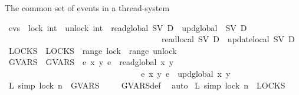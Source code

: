 \begin{isabellebody}
\isamarkuptrue%
%
\endisatagdocument
{\isafolddocument}%
%
\isadelimdocument
%
\endisadelimdocument
%
\begin{isamarkuptext}%
The common set of events in a thread-system%
\end{isamarkuptext}\isamarkuptrue%
\isamarkupfalse%
\ evs\ {\isacharequal}{\kern0pt}\ lock\ int\ {\isacharbar}{\kern0pt}\ unlock\ int\ {\isacharbar}{\kern0pt}\ read\isactrlsub g\isactrlsub l\isactrlsub o\isactrlsub b\isactrlsub a\isactrlsub l\ SV\ D\ {\isacharbar}{\kern0pt}\ upd\isactrlsub g\isactrlsub l\isactrlsub o\isactrlsub b\isactrlsub a\isactrlsub l\ \ SV\ D\ \isanewline
\ \ \ \ \ \ \ \ \ \ \ \ \ \ \ \ \ \ \ \ \ \ \ \ \ \ \ \ \ \ \ \ \ \ \ \ \ {\isacharbar}{\kern0pt}\ read\isactrlsub l\isactrlsub o\isactrlsub c\isactrlsub a\isactrlsub l\ SV\ D\ {\isacharbar}{\kern0pt}\ update\isactrlsub l\isactrlsub o\isactrlsub c\isactrlsub a\isactrlsub l\ SV\ D\ \isanewline
\isanewline
{}\isamarkupfalse%
\ LOCKS\ \ {\isacartoucheopen}LOCKS\ {\isasymequiv}\ range\ lock\ {\isasymunion}\ range\ unlock{\isacartoucheclose}\isanewline
{}\isamarkupfalse%
\ GVARS\ \ {\isacartoucheopen}GVARS\ {\isasymequiv}\ {\isacharbraceleft}{\kern0pt}e{\isachardot}{\kern0pt}\ {\isasymexists}x{\isachardot}{\kern0pt}\ {\isasymexists}y{\isachardot}{\kern0pt}\ e\ {\isacharequal}{\kern0pt}\ read\isactrlsub g\isactrlsub l\isactrlsub o\isactrlsub b\isactrlsub a\isactrlsub l\ x\ y\ {\isacharbraceright}{\kern0pt}\ {\isasymunion}\ \isanewline
\ \ \ \ \ \ \ \ \ \ \ \ \ \ \ \ \ \ \ \ \ \ \ \ \ \ \ \ \ \ \ \ \ {\isacharbraceleft}{\kern0pt}e{\isachardot}{\kern0pt}\ {\isasymexists}x{\isachardot}{\kern0pt}\ {\isasymexists}y{\isachardot}{\kern0pt}\ e\ {\isacharequal}{\kern0pt}\ upd\isactrlsub g\isactrlsub l\isactrlsub o\isactrlsub b\isactrlsub a\isactrlsub l\ x\ y\ {\isacharbraceright}{\kern0pt}{\isacartoucheclose}\isanewline
\isanewline
{}\isamarkupfalse%
\ L{}\ {\isacharbrackleft}{\kern0pt}simp{\isacharbrackright}{\kern0pt}{\isacharcolon}{\kern0pt}\ {\isacartoucheopen}lock\ n\ {\isasymnotin}\ GVARS{\isacartoucheclose}%
\isadelimproof
\ \ \ %
\endisadelimproof
%
\isatagproof
{}\isamarkupfalse%
\ GVARS{\isacharunderscore}{\kern0pt}def\ \isamarkupfalse%
\ auto%
\endisatagproof
{\isafoldproof}%
%
\isadelimproof
%
\endisadelimproof
\isanewline
{}\isamarkupfalse%
\ L{}\ {\isacharbrackleft}{\kern0pt}simp{\isacharbrackright}{\kern0pt}{\isacharcolon}{\kern0pt}\ {\isacartoucheopen}lock\ n\ {\isasymin}\ LOCKS{\isacartoucheclose}%

\end{isabellebody}

